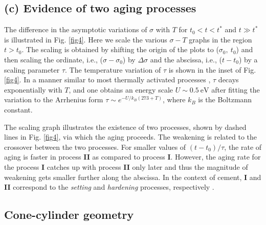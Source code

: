 \documentclass[final,5p,twocolumn]{elsarticle}
\begin{document}
{	\subsection*{(c) Evidence of two aging processes }The difference in the asymptotic variations of $\sigma$ with $T$ for $t_0<t<t^{\ast}$ and $t\gg t^{\ast}$ is illustrated in Fig. \ref{fig4}. Here we scale the various $\sigma-T$ graphs in the region $t>t_0$. The scaling is obtained by shifting the origin of the plots to ($\sigma_0,~t_0$) and then scaling the ordinate, i.e., ($\sigma-\sigma_0$) by $\Delta\sigma$ and the abscissa, i.e., ($t-t_0$) by a scaling parameter $\tau$. The temperature variation of $\tau$ is shown in the inset of Fig. \ref{fig4}. In a manner similar to most thermally activated processes \cite{ediger_supercooled_1996}, $\tau$ decays exponentially with $T$, and one obtains an energy scale $U\sim0.5~\mbox{eV}$ after fitting the variation to the Arrhenius form $\tau\sim e^{-U/k_B(273+T)}$, where $k_B$ is the Boltzmann constant.
	
The scaling graph illustrates the existence of two processes, shown by dashed lines in Fig. \ref{fig4}, via which the aging  proceeds. The weakening is related to the crossover between the two  processes. For smaller values of $(t-t_0)/\tau$, the rate of aging is faster in  process \textbf{II} as compared to  process \textbf{I}. However, the aging rate for the  process \textbf{I} catches up with  process \textbf{II} only later and thus the magnitude of weakening gets smaller further along the abscissa. In the context of cement,  \textbf{I}  and \textbf{II} correspond to the \textit{setting} and \textit{hardening} processes, respectively \cite{nachbaur_2001}.
	
	
	\subsection{Cone-cylinder geometry} 
}
\end{document}
